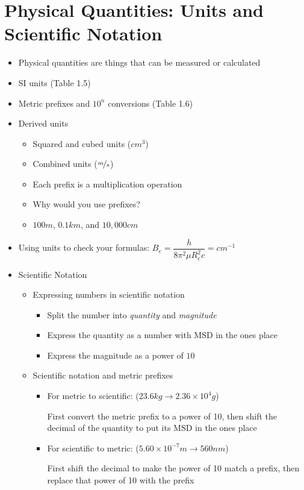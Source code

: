 \documentclass[12pt, openany, letterpaper]{memoir}
\begin{document}
\section{Physical Quantities: Units and Scientific Notation}
\begin{itemize}
	\item Physical quantities are things that can be measured or calculated
	\item SI units (Table 1.5)
	\item Metric prefixes and $10^n$ conversions (Table 1.6)
	\item Derived units
	\begin{itemize}
		\item Squared and cubed units ($cm^3$)
		\item Combined units ($\nicefrac{m}{s}$)
	\end{itemize}
	\begin{itemize}		
		\item Each prefix is a multiplication operation
		\item Why would you use prefixes?
		\item $100m$, $0.1km$, and $10,000cm$
	\end{itemize}
	\item Using units to check your formulas: $B_e = \dfrac{h}{8\pi^2\mu R_e^2c}=cm^{-1}$
\item Scientific Notation
\begin{itemize}
	\item Expressing numbers in scientific notation
	\begin{itemize}
		\item Split the number into \emph{quantity} and \emph{magnitude}
		\item Express the quantity as a number with MSD in the ones place
		\item Express the magnitude as a power of $10$
	\end{itemize}
	\item Scientific notation and metric prefixes
	\begin{itemize}
		\item For metric to scientific: ($23.6kg\rightarrow2.36\times10^4g$)
		
		First convert the metric prefix to a power of 10, then shift the decimal of the quantity to put its MSD in the ones place
		\item For scientific to metric: ($5.60\times10^{-7}m\rightarrow560nm$)
		
		First shift the decimal to make the power of 10 match a prefix, then replace that power of 10 with the prefix
	\end{itemize}
\end{itemize}
\end{itemize}
\end{document}
